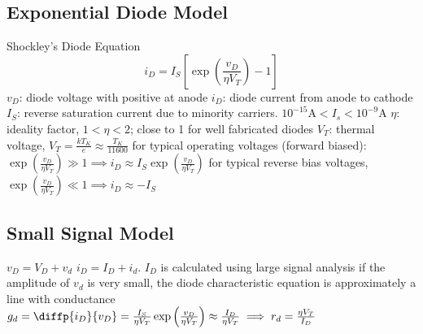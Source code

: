 \documentclass[a4paper,11pt]{article}
\begin{document}
	\subsection{Exponential Diode Model}
	\begin{outline}[enumerate]
		\1 Shockley's Diode Equation 
		\begin{equation}
			i_{D} = I_{S}\left[ \exp \left( \frac{v_{D}}{\eta V_{T} } \right) - 1\right]
		\end{equation}
		\2 $v_{D}$: diode voltage with positive at anode
		\2 $i_{D}$: diode current from anode to cathode
		\2 $I_{S}$: reverse saturation current due to minority carriers. $10^{-15} \text{A} < I_{s} < 10^{-9} \text{A}$
		\2 $\eta$: ideality factor, $1 < \eta < 2$; close to 1 for well fabricated diodes
		\2 $V_{T}$: thermal voltage, $V_{T} = \frac{kT_{K}}{e} \approx \frac{T_{K}}{11600}$
		\1 for typical operating voltages (forward biased): $\exp \left( \frac{v_{D}}{\eta V_{T} } \right) \gg 1 \implies i_{D} \approx I_{S} \exp \left( \frac{v_{D}}{\eta V_{T} } \right)$
		\1 for typical reverse bias voltages, $\exp \left( \frac{v_{D}}{\eta V_{T} } \right) \ll 1 \implies i_{D} \approx - I_{S}$	
	\end{outline}

	\subsection{Small Signal Model}
	\begin{outline}[enumerate]
		\1 $v_{D} = V_{D} + v_{d}$ 
		\1 $i_{D} = I_{D} + i_{d}$. $I_{D}$ is calculated using large signal analysis
		\1 if the amplitude of $v_{d}$ is very small, the diode characteristic equation is approximately a line with conductance $g_{d} = \diffp{i_{D}}{{v_{D}}} = \frac{I_{S}}{\eta V_{T}} \exp \left( \frac{v_{D}}{\eta V_{T}} \right) \approx \frac{I_D}{\eta V_{T}} \implies r_{d} = \frac{\eta V_{T}}{I_{D}}$
	\end{outline}
\end{document}
